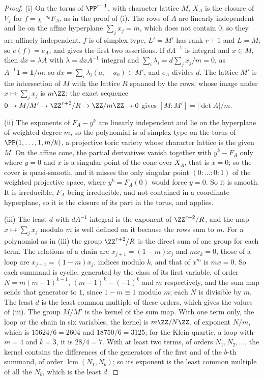 \begin{proof}
(i) On the torus of $\PP^{r+1}$, with character lattice $M$, $X_{A}$ is the
closure of $V_{f}$ for $f=\chi^{-a_{0}}F_{A}$, as in the proof of
(i). The rows of $A$ are linearly independent and lie on
the affine hyperplane $\sum_{j}x_{j}=m$, which does not contain $0$, so they
are affinely independent, $f$ is of simplex type, $L'=M'$ has rank $r+1$ and
$L=M$; so $e(f)=e_{A}$, and  gives the first two
assertions. If $dA^{-1}$ is integral and $x\in M$, then $dx=\lambda A$ with
$\lambda=dxA^{-1}$ integral and $\sum_{i}\lambda_{i}=d\sum_{j}x_{j}/m=0$,
as $A^{-1}\mathbf{1}=\mathbf{1}/m$; so $dx=\sum_{i}\lambda_{i}(a_{i}-a_{0})
\in M'$, and $e_{A}$ divides $d$. The lattice $M'$ is the intersection of $M$
with the lattice $R$ spanned by the rows, whose image under
$x\mapsto\sum_{j}x_{j}$ is $m\ZZ$; the exact sequence $0\to M/M'\to
\ZZ^{r+2}/R\to\ZZ/m\ZZ\to0$ gives $[M:M']=|\det A|/m$.

(ii) The exponents of $F_{A}-y^{k}$ are linearly independent and lie on the
hyperplane of weighted degree $m$, so the polynomial is of simplex type on
the torus of $\PP(1,\dots,1,m/k)$, a projective toric variety whose
character lattice is the given $M$. On the affine cone, the partial
derivatives vanish together with $y^{k}-F_{A}$ only where $y=0$ and $x$ is a
singular point of the cone over $X_{A}$, that is $x=0$; so the cover is
quasi-smooth, and it misses the only singular point $(0:\dots:0:1)$ of the
weighted projective space, where $y^{k}=F_{A}(0)$ would force $y=0$. So it is
smooth. It is irreducible, $F_{A}$ being irreducible, and not contained in a
coordinate hyperplane, so it is the closure of its part in the torus, and
 applies.

(iii) The least $d$ with $dA^{-1}$ integral is the exponent of
$\ZZ^{r+2}/R$, and the map $x\mapsto\sum_{j}x_{j}$ modulo $m$ is well defined
on it because the rows sum to $m$. For a polynomial as in
(iii) the group $\ZZ^{r+2}/R$ is the direct sum of one
group for each term. The relations of a chain are $x_{j+1}=(1-m)x_{j}$ and
$mx_{k}=0$, those of a loop are $x_{j+1}=(1-m)x_{j}$, indices modulo $k$, and
that of $x^{m}$ is $mx=0$. So each summand is cyclic, generated by the class
of its first variable, of order $N=m(m-1)^{k-1}$, $(m-1)^{k}-(-1)^{k}$ and
$m$ respectively, and the sum map sends that generator to $1$, since
$1-m\equiv1$ modulo $m$; each $N$ is divisible by $m$. The least $d$ is the
least common multiple of these orders, which gives the values of
(iii). The group $M/M'$ is the kernel of the sum map. With
one term only, the loop or the chain in six variables, the kernel is
$m\ZZ/N\ZZ$, of exponent $N/m$, which is $15624/6=2604$ and $18750/6=3125$;
for the Klein quartic, a loop with $m=4$ and $k=3$, it is $28/4=7$. With at
least two terms, of orders $N_{1},N_{2},\dots$, the kernel contains the
differences of the generators of the first and of the $b$-th summand, of order
$\operatorname{lcm}(N_{1},N_{b})$; so its exponent is the least common multiple
of all the $N_{b}$, which is the least $d$.
\end{proof}

